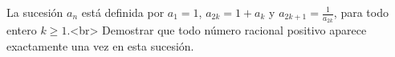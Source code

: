 La sucesión $a_n$ está definida por $a_1 = 1$, $a_{2k} = 1 + a_k$ y $a_{2k+1} = \frac{1}{a_{2k}}$, para todo entero $k \geq 1$.<br>
Demostrar que todo número racional positivo aparece exactamente una vez en esta sucesión.
